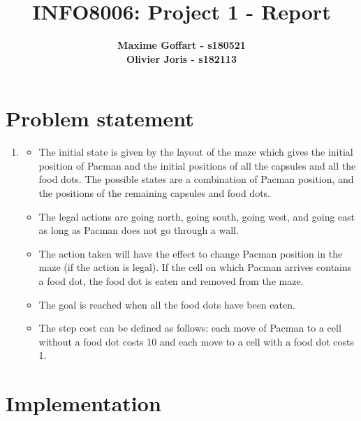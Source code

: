 \documentclass{article}
\begin{document}

\title{\Large{INFO8006: Project 1 - Report}}
\vspace{1cm}
\author{\small{\bf Maxime Goffart - s180521} \\ \small{\bf Olivier Joris - s182113}}

\maketitle


\section{Problem statement}

\begin{enumerate}[label=\alph*.,leftmargin=1.35em]
    \item
    	\begin{itemize}
    		\item The initial state is given by the layout of the maze which gives the initial position of Pacman and the initial positions of all the capsules and all the food dots. The possible states are a combination of Pacman position, and the positions of the remaining capsules and food dots.
    		\item The legal actions are going north, going south, going west, and going east as long as Pacman does not go through a wall.
    		\item The action taken will have the effect to change Pacman position in the maze (if the action is legal). If the cell on which Pacman arrives contains a food dot, the food dot is eaten and removed from the maze.
    		\item The goal is reached when all the food dots have been eaten.
    		\item The step cost can be defined as follows: each move of Pacman to a cell without a food dot costs 10 and each move to a cell with a food dot costs 1.
    	\end{itemize}
\end{enumerate}

\section{Implementation}
\end{document}

